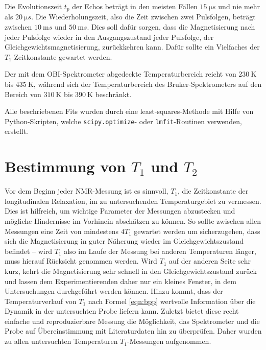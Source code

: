 Die Evolutionszeit $t_p$ der Echos beträgt in den meisten Fällen $\SI{15}{\micro s}$ und nie mehr als $\SI{20}{\micro s}$. Die Wiederholungszeit, also die Zeit zwischen zwei Pulsfolgen, beträgt zwischen $\SI{10}{\milli s}$ und $\SI{50}{\milli s}$. Dies soll dafür sorgen, dass die Magnetisierung nach jeder Pulsfolge wieder in den Ausgangszustand jeder Pulsfolge, der Gleichgewichtsmagnetisierung, zurückkehren kann. Dafür sollte ein Vielfaches der $T_1$-Zeitkonstante gewartet werden.

Der mit dem OBI-Spektrometer abgedeckte Temperaturbereich reicht von $\SI{230}{\kelvin}$ bis $\SI{435}{\kelvin}$, während sich der Temperaturbereich des Bruker-Spektrometers auf den Bereich von $\SI{310}{\kelvin}$ bis $\SI{390}{\kelvin}$ beschränkt.

Alle beschriebenen Fits wurden durch eine least-squares-Methode mit Hilfe von Python-Skripten, welche \texttt{scipy.optimize}- oder \texttt{lmfit}-Routinen verwenden, erstellt.


\section{Bestimmung von $T_1$ und $T_2$} \label{section:res:T_1}

Vor dem Beginn jeder NMR-Messung ist es sinnvoll, $T_1$, die Zeitkonstante der longitudinalen Relaxation, im zu untersuchenden Temperaturgebiet zu vermessen. Dies ist hilfreich, um wichtige Parameter der Messungen abzustecken und mögliche Hindernisse im Vorhinein abschätzen zu können. So sollte zwischen allen Messungen eine Zeit von mindestens $4 T_1$ gewartet werden um sicherzugehen, dass sich die Magnetisierung in guter Näherung wieder im Gleichgewichtszustand befindet -- wird $T_1$ also im Laufe der Messung bei anderen Temperaturen länger, muss hierauf Rücksicht genommen werden. Wird $T_1$ auf der anderen Seite sehr kurz, kehrt die Magnetisierung sehr schnell in den Gleichgewichtszustand zurück und lassen dem Experimentierenden daher nur ein kleines Fenster, in dem Untersuchungen durchgeführt werden können. Hinzu kommt, dass der Temperaturverlauf von $T_1$ nach Formel \eqref{eqn:bpp} wertvolle Information über die Dynamik in der untersuchten Probe liefern kann. Zuletzt bietet diese recht einfache und reproduzierbare Messung die Möglichkeit, das Spektrometer und die Probe auf Übereinstimmung mit Literaturdaten hin zu überprüfen. Daher wurden zu allen untersuchten Temperaturen $T_1$-Messungen aufgenommen.

